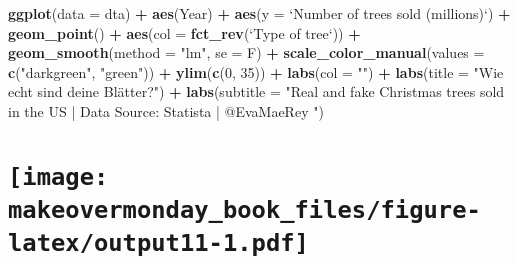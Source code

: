 \documentclass[]{book}
\newenvironment{Shaded}{\begin{snugshade}}{\end{snugshade}}
\newcommand{\KeywordTok}[1]{\textcolor[rgb]{0.13,0.29,0.53}{\textbf{#1}}}
\newcommand{\DataTypeTok}[1]{\textcolor[rgb]{0.13,0.29,0.53}{#1}}
\newcommand{\DecValTok}[1]{\textcolor[rgb]{0.00,0.00,0.81}{#1}}
\newcommand{\StringTok}[1]{\textcolor[rgb]{0.31,0.60,0.02}{#1}}
\newcommand{\OperatorTok}[1]{\textcolor[rgb]{0.81,0.36,0.00}{\textbf{#1}}}
\newcommand{\NormalTok}[1]{#1}
\theoremstyle{definition}
\theoremstyle{definition}
\theoremstyle{definition}
\theoremstyle{remark}
\begin{document}
\begin{Shaded}
\begin{Highlighting}[]
\KeywordTok{ggplot}\NormalTok{(}\DataTypeTok{data =}\NormalTok{ dta) }\OperatorTok{+}
\StringTok{  }\KeywordTok{aes}\NormalTok{(Year) }\OperatorTok{+}
\StringTok{  }\KeywordTok{aes}\NormalTok{(}\DataTypeTok{y =} \StringTok{`}\DataTypeTok{Number of trees sold (millions)}\StringTok{`}\NormalTok{) }\OperatorTok{+}
\StringTok{  }\KeywordTok{geom_point}\NormalTok{() }\OperatorTok{+}
\StringTok{  }\KeywordTok{aes}\NormalTok{(}\DataTypeTok{col =} \KeywordTok{fct_rev}\NormalTok{(}\StringTok{`}\DataTypeTok{Type of tree}\StringTok{`}\NormalTok{)) }\OperatorTok{+}
\StringTok{  }\KeywordTok{geom_smooth}\NormalTok{(}\DataTypeTok{method =} \StringTok{"lm"}\NormalTok{, }\DataTypeTok{se =}\NormalTok{ F) }\OperatorTok{+}
\StringTok{  }\KeywordTok{scale_color_manual}\NormalTok{(}\DataTypeTok{values =} \KeywordTok{c}\NormalTok{(}\StringTok{"darkgreen"}\NormalTok{, }\StringTok{"green"}\NormalTok{)) }\OperatorTok{+}
\StringTok{  }\KeywordTok{ylim}\NormalTok{(}\KeywordTok{c}\NormalTok{(}\DecValTok{0}\NormalTok{, }\DecValTok{35}\NormalTok{)) }\OperatorTok{+}
\StringTok{  }\KeywordTok{labs}\NormalTok{(}\DataTypeTok{col =} \StringTok{""}\NormalTok{) }\OperatorTok{+}
\StringTok{  }\KeywordTok{labs}\NormalTok{(}\DataTypeTok{title =} \StringTok{"Wie echt sind deine Blätter?"}\NormalTok{) }\OperatorTok{+}
\StringTok{  }\KeywordTok{labs}\NormalTok{(}\DataTypeTok{subtitle =} \StringTok{"Real and fake Christmas trees sold in the US | Data Source: Statista | @EvaMaeRey "}\NormalTok{) }
\end{Highlighting}
\end{Shaded}

\section[]{\texorpdfstring{\protect\texttt{[image: makeovermonday\_book\_files/figure-latex/output11-1.pdf]}}{}}\label{section-20}

\clearpage
\end{document}
